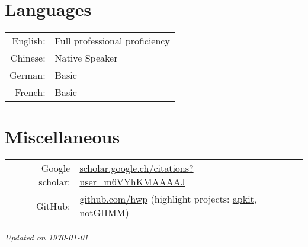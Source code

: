 \documentclass[a4paper,9pt]{extarticle} %
\begin{document}

\section{Languages}

\begin{tabular}{rl}
  English: & Full professional proficiency \\
  Chinese: & Native Speaker \\
  German: & Basic \\
  French: & Basic \\
\end{tabular}

\section{Miscellaneous}

\begin{tabular}{rl}
  Google scholar: & \href{https://scholar.google.ch/citations?user=m6VYhKMAAAAJ&hl=en}{scholar.google.ch/citations?user=m6VYhKMAAAAJ} \\
  GitHub: & \href{https://github.com/hwp}{github.com/hwp} (highlight projects: \href{https://github.com/hwp/apkit}{apkit}, \href{https://github.com/hwp/notGHMM}{notGHMM}) \\
\end{tabular}



\vfill
\centering \footnotesize \itshape{Updated on \today}
\end{document}
